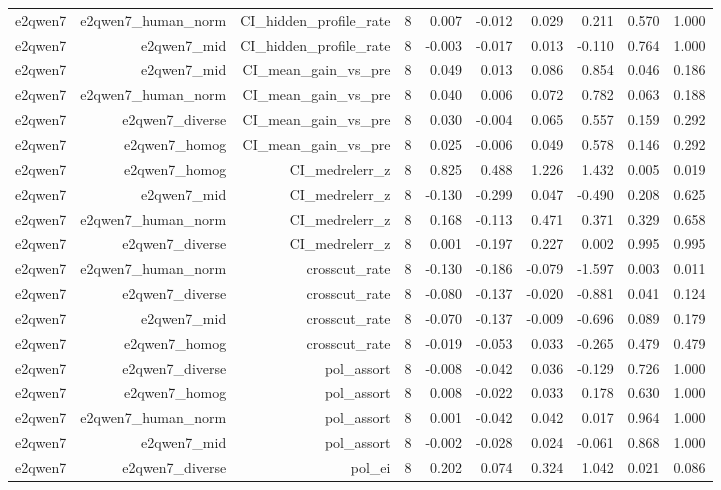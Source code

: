 \documentclass[11pt]{article}
\begin{document}
\begin{landscape}
\begin{longtable}{@{}lrrrrrrrrr@{}}
e2qwen7 & e2qwen7\_human\_norm & CI\_hidden\_profile\_rate & 8 & 0.007 & -0.012 & 0.029 & 0.211 & 0.570 & 1.000 \\
e2qwen7 & e2qwen7\_mid & CI\_hidden\_profile\_rate & 8 & -0.003 & -0.017 & 0.013 & -0.110 & 0.764 & 1.000 \\
e2qwen7 & e2qwen7\_mid & CI\_mean\_gain\_vs\_pre & 8 & 0.049 & 0.013 & 0.086 & 0.854 & 0.046 & 0.186 \\
e2qwen7 & e2qwen7\_human\_norm & CI\_mean\_gain\_vs\_pre & 8 & 0.040 & 0.006 & 0.072 & 0.782 & 0.063 & 0.188 \\
e2qwen7 & e2qwen7\_diverse & CI\_mean\_gain\_vs\_pre & 8 & 0.030 & -0.004 & 0.065 & 0.557 & 0.159 & 0.292 \\
e2qwen7 & e2qwen7\_homog & CI\_mean\_gain\_vs\_pre & 8 & 0.025 & -0.006 & 0.049 & 0.578 & 0.146 & 0.292 \\
e2qwen7 & e2qwen7\_homog & CI\_medrelerr\_z & 8 & 0.825 & 0.488 & 1.226 & 1.432 & 0.005 & 0.019 \\
e2qwen7 & e2qwen7\_mid & CI\_medrelerr\_z & 8 & -0.130 & -0.299 & 0.047 & -0.490 & 0.208 & 0.625 \\
e2qwen7 & e2qwen7\_human\_norm & CI\_medrelerr\_z & 8 & 0.168 & -0.113 & 0.471 & 0.371 & 0.329 & 0.658 \\
e2qwen7 & e2qwen7\_diverse & CI\_medrelerr\_z & 8 & 0.001 & -0.197 & 0.227 & 0.002 & 0.995 & 0.995 \\
e2qwen7 & e2qwen7\_human\_norm & crosscut\_rate & 8 & -0.130 & -0.186 & -0.079 & -1.597 & 0.003 & 0.011 \\
e2qwen7 & e2qwen7\_diverse & crosscut\_rate & 8 & -0.080 & -0.137 & -0.020 & -0.881 & 0.041 & 0.124 \\
e2qwen7 & e2qwen7\_mid & crosscut\_rate & 8 & -0.070 & -0.137 & -0.009 & -0.696 & 0.089 & 0.179 \\
e2qwen7 & e2qwen7\_homog & crosscut\_rate & 8 & -0.019 & -0.053 & 0.033 & -0.265 & 0.479 & 0.479 \\
e2qwen7 & e2qwen7\_diverse & pol\_assort & 8 & -0.008 & -0.042 & 0.036 & -0.129 & 0.726 & 1.000 \\
e2qwen7 & e2qwen7\_homog & pol\_assort & 8 & 0.008 & -0.022 & 0.033 & 0.178 & 0.630 & 1.000 \\
e2qwen7 & e2qwen7\_human\_norm & pol\_assort & 8 & 0.001 & -0.042 & 0.042 & 0.017 & 0.964 & 1.000 \\
e2qwen7 & e2qwen7\_mid & pol\_assort & 8 & -0.002 & -0.028 & 0.024 & -0.061 & 0.868 & 1.000 \\
e2qwen7 & e2qwen7\_diverse & pol\_ei & 8 & 0.202 & 0.074 & 0.324 & 1.042 & 0.021 & 0.086 \\

\end{longtable}
\end{landscape}
\end{document}
